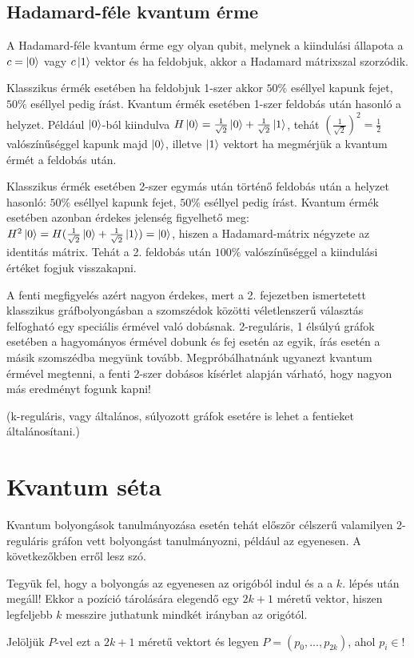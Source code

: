 \section{\textbf{Hadamard-féle kvantum érme}}

A Hadamard-féle kvantum érme egy olyan qubit, melynek a kiindulási állapota a
$c = \ket{0}$ vagy $c \ket{1}$ vektor és ha feldobjuk, akkor a Hadamard mátrixszal
szorzódik.

Klasszikus érmék esetében ha feldobjuk 1-szer akkor $50\%$ eséllyel kapunk fejet,
$50\%$ eséllyel pedig írást. Kvantum érmék esetében 1-szer feldobás után hasonló a helyzet.
Például $\ket{0}$-ból kiindulva $H\ket{0} = \frac{1}{\sqrt{2}}\ket{0} +
  \frac{1}{\sqrt{2}}\ket{1}$, tehát $(\frac{1}{\sqrt{2}})^2 = \frac{1}{2}$ valószínűséggel
kapunk majd $\ket{0}$, illetve $\ket{1}$ vektort ha megmérjük a kvantum érmét a feldobás után.

Klasszikus érmék esetében 2-szer egymás után történő feldobás után a helyzet
hasonló:  $50\%$ eséllyel kapunk fejet, $50\%$ eséllyel pedig írást. Kvantum érmék
esetében azonban érdekes jelenség figyelhető meg: $H^2\ket{0} = H(\frac{1}{\sqrt{2}}\ket{0} +
  \frac{1}{\sqrt{2}}\ket{1}) = \ket{0}$, hiszen a Hadamard-mátrix négyzete az
identitás mátrix. Tehát a 2. feldobás után $100\%$ valószínűséggel a kiindulási
értéket fogjuk visszakapni.

A fenti megfigyelés azért nagyon érdekes, mert a 2. fejezetben ismertetett
klasszikus gráfbolyongásban a szomszédok közötti véletlenszerű választás
felfogható egy speciális érmével való dobásnak. 2-reguláris, 1 élsúlyú gráfok
esetében a hagyományos érmével dobunk és fej esetén az egyik, írás esetén a másik
szomszédba megyünk tovább. Megpróbálhatnánk ugyanezt kvantum érmével megtenni,
a fenti 2-szer dobásos kísérlet alapján várható, hogy nagyon más eredményt fogunk
kapni!

(k-reguláris, vagy általános, súlyozott gráfok esetére is lehet a fentieket
általánosítani.)

\chapter{\textbf{Kvantum séta}}

Kvantum bolyongások tanulmányozása esetén tehát először célszerű valamilyen
2-reguláris gráfon vett bolyongást tanulmányozni, például az egyenesen. A következőkben
erről lesz szó.

Tegyük fel, hogy a bolyongás az egyenesen az origóból indul és a a $k.$ lépés
után megáll! Ekkor a pozíció tárolására elegendő egy $2k+1$ méretű vektor,
hiszen legfeljebb $k$ messzire juthatunk mindkét irányban az origótól.

Jelöljük $P$-vel ezt a $2k+1$ méretű vektort és legyen $P=(p_0,...,p_{2k})$,
ahol $p_i\in$!



